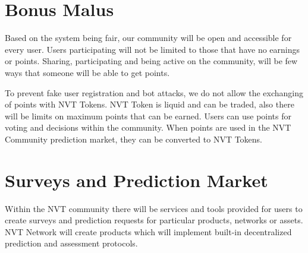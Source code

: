 
\section{Bonus Malus}

Based on the system being fair, our community will be open and accessible for every user. Users participating will not be limited to those that have no earnings or points. Sharing, participating and being active on the community, will be few ways that someone will be able to get points.

To prevent fake user registration and bot attacks, we do not allow the exchanging of points with NVT Tokens. NVT Token is liquid and can be traded, also there will be limits on maximum points that can be earned. Users can use points for voting and decisions within the community. When points are used in the NVT Community prediction market, they can be converted to NVT Tokens.


\section{Surveys and Prediction Market}

Within the NVT community there will be services and tools provided for users to create surveys and prediction requests for particular products, networks or assets. NVT Network will create products which will implement built-in decentralized prediction and assessment protocols.